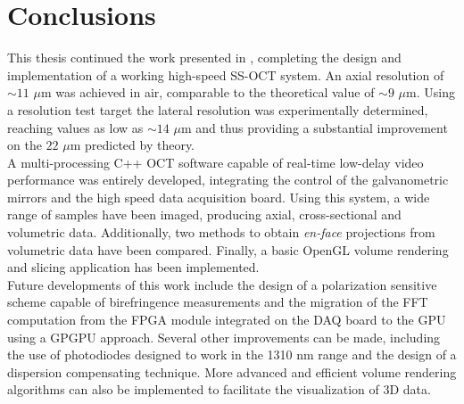 \chapter{Conclusions}
\label{ch:conclusions}

This thesis continued the work presented in \cite{Calabrese2017}, completing the design and implementation of a working high-speed SS-OCT system. An axial resolution of $\sim 11$ $\mu$m was achieved in air,  comparable to the theoretical value of $\sim9$ $\mu$m. Using a resolution test target the lateral resolution was experimentally determined, reaching values as low as $\sim 14$ $\mu$m and thus providing a substantial improvement on the $22$ $\mu$m predicted by theory. \\

\noindent A multi-processing C++ OCT software capable of real-time low-delay video performance was entirely developed, integrating the control of the galvanometric mirrors and the high speed data acquisition board. Using this system, a wide range of samples have been imaged, producing axial, cross-sectional and volumetric data. Additionally, two methods to obtain \emph{en-face} projections from volumetric data have been compared. Finally, a basic OpenGL volume rendering and slicing application has been implemented. \\

\noindent Future developments of this work include the design of a polarization sensitive scheme capable of birefringence measurements and the migration of the FFT computation from the FPGA module integrated on the DAQ board to the GPU using a GPGPU approach. Several other improvements can be made, including the use of photodiodes designed to work in the 1310 nm range and the design of a dispersion compensating technique. More advanced and efficient volume rendering algorithms can also be implemented to facilitate the visualization of 3D data. 


